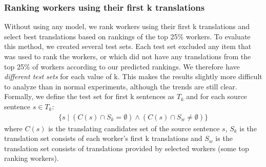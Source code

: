 \documentclass[11pt,letterpaper]{article}
\begin{document}
 \subsubsection{Ranking workers using their first k translations}
 Without using any model, we rank workers using their first k translations and select best translations based on rankings of the top 25\% workers. To evaluate this method, we created several test sets.  Each test set excluded any item that was used to rank the workers, or which did not have any translations from the top 25\% of workers according to our predicted rankings.  We therefore have \emph{different test sets} for each value of k.  This makes the results slightly more difficult to analyze than in normal experiments, although the trends are still clear.
Formally, we define the test set for first k sentences as $T_k$ and for each source sentence $s \in T_k$:
\begin{align*}
  \{ s \mid (C(s) \cap S_k = \emptyset)   \wedge (C(s) \cap S_w \neq \emptyset)    \}
\end{align*}
where $C(s)$ is the translating candidates set of the source sentence $s$, $S_k$ is the translation set consists of each worker's first k translations and $S_w$ is the translation set consists of translations provided by selected workers (some top ranking workers). 
\end{document}
